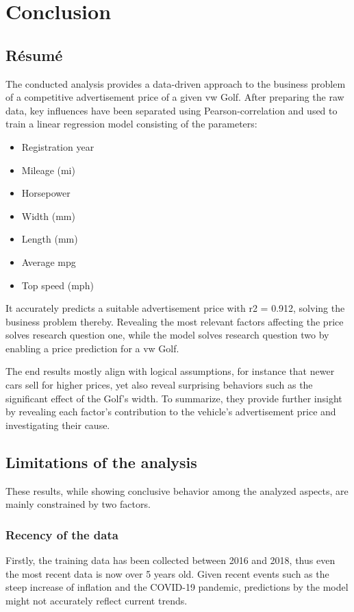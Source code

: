 \chapter{Conclusion}
\section{Résumé}

The conducted analysis provides a data-driven approach to the business problem of a competitive advertisement price of a given \ac{vw} Golf.
After preparing the raw data, key influences have been separated using Pearson-correlation and used to train a linear regression model consisting of the parameters:
\begin{itemize}
    \item Registration year
    \item Mileage (mi)
    \item Horsepower
    \item Width (mm)
    \item Length (mm)
    \item Average mpg
    \item Top speed (mph)
\end{itemize}
It accurately predicts a suitable advertisement price with \ac{r2} = 0.912, solving the business problem thereby.
Revealing the most relevant factors affecting the price solves research question one, while the model solves research question two by enabling a price prediction for a \ac{vw} Golf.
\par
The end results mostly align with logical assumptions, for instance that newer cars sell for higher prices, yet also reveal
surprising behaviors such as the significant effect of the Golf's width.
To summarize, they provide further insight by revealing each factor's contribution to the vehicle's advertisement price and investigating their cause.
\section{Limitations of the analysis}
These results, while showing conclusive behavior among the analyzed aspects, are mainly constrained by two factors.
\subsection{Recency of the data}
Firstly, the training data has been collected between 2016 and 2018, thus even the most recent data
is now over 5 years old. Given recent events such as the steep increase of inflation
and the COVID-19 pandemic, predictions by the model might not accurately reflect current trends.

